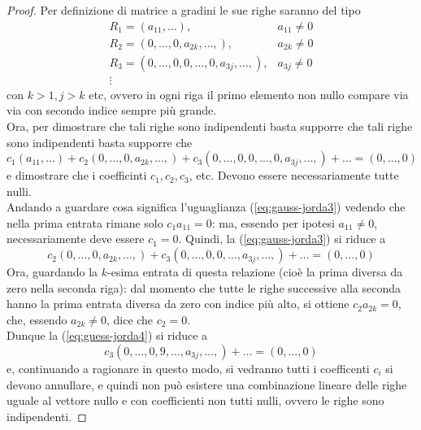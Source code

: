 \begin{proof}
  Per definizione di matrice a gradini le sue righe saranno del tipo
  \begin{eqnarray*}
    R_1=(a_{11},\dots), & a_{11}\neq0\\
    R_2=(0,\dots, 0, a_{2k},\dots,), & a_{2k}\neq 0\\
    R_3=(0,\dots,0,0,\dots,0,a_{3j},\dots,), & a_{3j}\neq 0\\
    \vdots
  \end{eqnarray*}
  con $k>1,j>k$ etc, ovvero in ogni riga il primo elemento non nullo
  compare via via con secondo indice sempre più grande.\\
  Ora, per dimostrare che tali righe sono indipendenti basta supporre che
  tali righe sono indipendenti basta supporre che
  \begin{equation}
    \label{eq:gauss-jorda3}
    c_1(a_{11},\dots)+c_2(0,\dots,0,a_{2k},\dots,)+c_3(0,\dots,0,0,\dots,
    0,a_{3j},\dots,)+\dots=(0,\dots,0)
  \end{equation}
  e dimostrare che i coefficinti $c_1,c_2,c_3$, etc. Devono essere
  necessariamente tutte nulli.\\
  Andando a guardare cosa significa l'uguaglianza (\ref{eq:gauss-jorda3})
  vedendo che nella prima entrata rimane solo $c_1a_{11}=0$: ma, essendo
  per ipotesi $a_{11}\neq 0$, necessariamente deve essere $c_1=0$. Quindi,
  la (\ref{eq:gauss-jorda3}) si riduce a
  \begin{equation}
    \label{eq:guess-jorda4}
    c_2(0,\dots,0,a_{2k},\dots,)+c_3(0,\dots,0,0,\dots,a_{3j},\dots,)+
    \dots= (0,\dots,0)
  \end{equation}
  Ora, guardando la $k$-esima entrata di questa relazione (cioè la prima
  diversa da zero nella seconda riga): dal momento che tutte le righe
  successive alla seconda hanno la prima entrata diversa da zero con
  indice più alto, si ottiene $c_2a_{2k}=0$, che, essendo $a_{2k}\neq 0$,
  dice che $c_2=0$.\\
  Dunque la (\ref{eq:guess-jorda4}) si riduce a
  \begin{equation*}
    c_3(0,\dots,0,9,\dots,a_{3j},\dots,)+\dots=(0,\dots,0)
  \end{equation*}
  e, continuando a ragionare in questo modo, si vedranno tutti i
  coefficenti $c_i$ si devono annullare, e quindi non può esistere una
  combinazione lineare delle righe uguale al vettore nullo e con
  coefficienti non tutti nulli, ovvero le righe sono indipendenti.
\end{proof}
